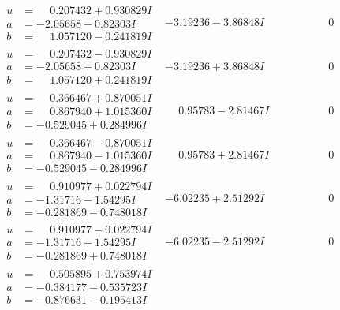 \documentclass[1p]{elsarticle_modified}
\theoremstyle{definition}
\begin{document}
$$\begin{array}{c|c|c}
\begin{aligned}
u &= \phantom{-}0.207432 + 0.930829 I \\
a &= -2.05658 - 0.82303 I \\
b &= \phantom{-}1.057120 - 0.241819 I\end{aligned}
 & -3.19236 - 3.86848 I & \phantom{-0.000000 } 0 \\ \hline\begin{aligned}
u &= \phantom{-}0.207432 - 0.930829 I \\
a &= -2.05658 + 0.82303 I \\
b &= \phantom{-}1.057120 + 0.241819 I\end{aligned}
 & -3.19236 + 3.86848 I & \phantom{-0.000000 } 0 \\ \hline\begin{aligned}
u &= \phantom{-}0.366467 + 0.870051 I \\
a &= \phantom{-}0.867940 + 1.015360 I \\
b &= -0.529045 + 0.284996 I\end{aligned}
 & \phantom{-}0.95783 - 2.81467 I & \phantom{-0.000000 } 0 \\ \hline\begin{aligned}
u &= \phantom{-}0.366467 - 0.870051 I \\
a &= \phantom{-}0.867940 - 1.015360 I \\
b &= -0.529045 - 0.284996 I\end{aligned}
 & \phantom{-}0.95783 + 2.81467 I & \phantom{-0.000000 } 0 \\ \hline\begin{aligned}
u &= \phantom{-}0.910977 + 0.022794 I \\
a &= -1.31716 - 1.54295 I \\
b &= -0.281869 - 0.748018 I\end{aligned}
 & -6.02235 + 2.51292 I & \phantom{-0.000000 } 0 \\ \hline\begin{aligned}
u &= \phantom{-}0.910977 - 0.022794 I \\
a &= -1.31716 + 1.54295 I \\
b &= -0.281869 + 0.748018 I\end{aligned}
 & -6.02235 - 2.51292 I & \phantom{-0.000000 } 0 \\ \hline\begin{aligned}
u &= \phantom{-}0.505895 + 0.753974 I \\
a &= -0.384177 - 0.535723 I \\
b &= -0.876631 - 0.195413 I\end{aligned}

\end{array}$$
\end{document}
